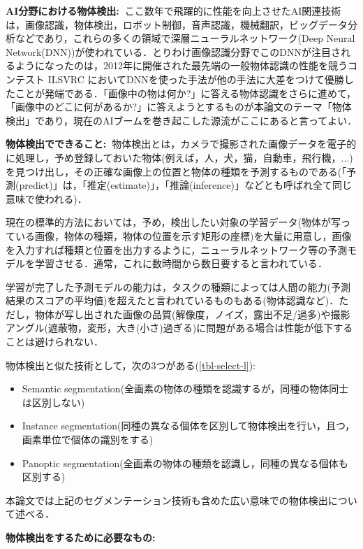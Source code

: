 \documentclass[originalpaper]{jsaiart}     %
\begin{document}
{\bf AI分野における物体検出:\ }ここ数年で飛躍的に性能を向上させたAI関連技術は，画像認識，物体検出，ロボット制御，音声認識，機械翻訳，ビッグデータ分析などであり，これらの多くの領域で深層ニューラルネットワーク(Deep Neural Network(DNN))が使われている．とりわけ画像認識分野でこのDNNが注目されるようになったのは，2012年に開催された最先端の一般物体認識の性能を競うコンテスト ILSVRC においてDNNを使った手法が他の手法に大差をつけて優勝したことが発端である．「画像中の物は何か?」に答える物体認識をさらに進めて，「画像中のどこに何があるか?」に答えようとするものが本論文のテーマ「物体検出」であり，現在のAIブームを巻き起こした源流がここにあると言ってよい．

{\bf 物体検出でできること:\ }物体検出とは，カメラで撮影された画像データを電子的に処理し，予め登録しておいた物体(例えば，人，犬，猫，自動車，飛行機，...)を見つけ出し，その正確な画像上の位置と物体の種類を予測するものである(「予測(predict)」は，「推定(estimate)」，「推論(inference)」などとも呼ばれ全て同じ意味で使われる)．

現在の標準的方法においては，予め，検出したい対象の学習データ(物体が写っている画像，物体の種類，物体の位置を示す矩形の座標)を大量に用意し，画像を入力すれば種類と位置を出力するように，ニューラルネットワーク等の予測モデルを学習させる．通常，これに数時間から数日要すると言われている．

学習が完了した予測モデルの能力は，タスクの種類によっては人間の能力(予測結果のスコアの平均値)を超えたと言われているものもある(物体認識など)．ただし，物体が写し出された画像の品質(解像度，ノイズ，露出不足/過多)や撮影アングル(遮蔽物，変形，大き(小さ)過ぎる)に問題がある場合は性能が低下することは避けられない．

物体検出と似た技術として，次の3つがある(\ref{tbl-select-l}):

\begin{itemize}
    \item Semantic segmentation(全画素の物体の種類を認識するが，同種の物体同士は区別しない)
    \item Instance segmentation(同種の異なる個体を区別して物体検出を行い，且つ，画素単位で個体の識別をする)
    \item Panoptic segmentation(全画素の物体の種類を認識し，同種の異なる個体も区別する)
\end{itemize}
本論文では上記のセグメンテーション技術も含めた広い意味での物体検出について述べる．

{\bf 物体検出をするために必要なもの:}
\end{document}
